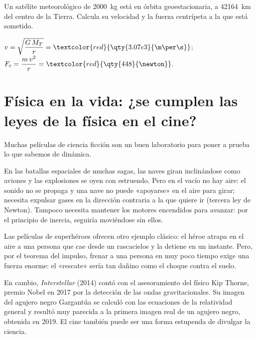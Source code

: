 \begin{exercise}
    Un satélite meteorológico de \qty{2000}{\kg} está en órbita geoestacionaria, a \qty{42164}{\km} del centro de la Tierra. Calcula su
    velocidad y la fuerza centrípeta a la que está sometido.
    \begin{solu}
        \(v = \sqrt{\dfrac{G\,M_T}{r}} = \textcolor{red}{\qty{3.07e3}{\m\per\s}}\); \(F_c = \dfrac{m\,v^2}{r} = \textcolor{red}{\qty{448}{\newton}}\).
    \end{solu}
\end{exercise}

\section{Física en la vida: ¿se cumplen las leyes de la física en el cine?}\label{sec:ud11-cine}

Muchas películas de ciencia ficción son un buen laboratorio para poner a prueba lo que sabemos de dinámica.

En las batallas espaciales de muchas sagas, las naves giran inclinándose como aviones y las explosiones se oyen con estruendo. Pero en
el vacío no hay aire: el sonido no se propaga y una nave no puede «apoyarse» en el aire para girar; necesita expulsar gases en la
dirección contraria a la que quiere ir (tercera ley de Newton). Tampoco necesita mantener los motores encendidos para avanzar: por el
principio de inercia, seguiría moviéndose sin ellos.

Las películas de superhéroes ofrecen otro ejemplo clásico: el héroe atrapa en el aire a una persona que cae desde un rascacielos y la
detiene en un instante. Pero, por el teorema del impulso, frenar a una persona en muy poco tiempo exige una fuerza enorme: el «rescate»
sería tan dañino como el choque contra el suelo.

En cambio, \textit{Interstellar} (2014) contó con el asesoramiento del físico Kip Thorne, premio Nobel en 2017 por la detección de las
ondas gravitacionales. Su imagen del agujero negro Gargantúa se calculó con las ecuaciones de la relatividad general y resultó muy
parecida a la primera imagen real de un agujero negro, obtenida en 2019. El cine también puede ser una forma estupenda de divulgar la
ciencia.


